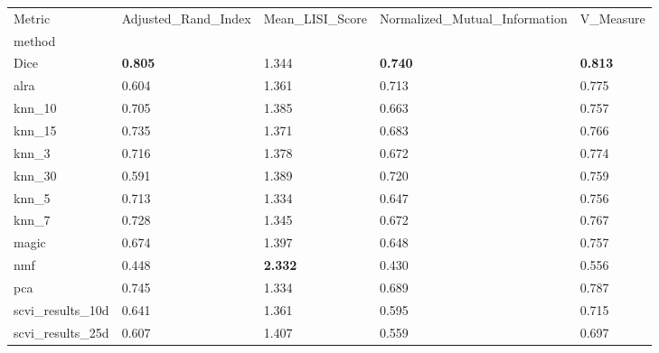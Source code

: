 \begin{tabular}{lllll}
\toprule
Metric & Adjusted_Rand_Index & Mean_LISI_Score & Normalized_Mutual_Information & V_Measure \\
method &  &  &  &  \\
\midrule
Dice & \textbf{0.805} & 1.344 & \textbf{0.740} & \textbf{0.813} \\
alra & 0.604 & 1.361 & 0.713 & 0.775 \\
knn_10 & 0.705 & 1.385 & 0.663 & 0.757 \\
knn_15 & 0.735 & 1.371 & 0.683 & 0.766 \\
knn_3 & 0.716 & 1.378 & 0.672 & 0.774 \\
knn_30 & 0.591 & 1.389 & 0.720 & 0.759 \\
knn_5 & 0.713 & 1.334 & 0.647 & 0.756 \\
knn_7 & 0.728 & 1.345 & 0.672 & 0.767 \\
magic & 0.674 & 1.397 & 0.648 & 0.757 \\
nmf & 0.448 & \textbf{2.332} & 0.430 & 0.556 \\
pca & 0.745 & 1.334 & 0.689 & 0.787 \\
scvi_results_10d & 0.641 & 1.361 & 0.595 & 0.715 \\
scvi_results_25d & 0.607 & 1.407 & 0.559 & 0.697 \\
\bottomrule
\end{tabular}
